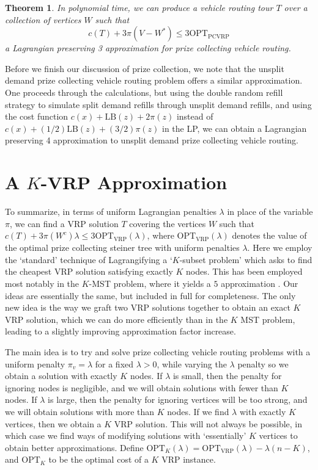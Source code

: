 \documentclass{article}
\theoremstyle{plain}
\theoremstyle{plain}
\newtheorem{theorem}{Theorem}
\begin{document}
\begin{theorem}
    In polynomial time, we can produce a vehicle routing tour $T$ over a collection of vertices $W$ such that
    \[ c(T) + 3\pi(V - W^*) \leq 3 \text{OPT}_{\text{PCVRP}} \]
    a Lagrangian preserving 3 approximation for prize collecting vehicle routing.
\end{theorem}

Before we finish our discussion of prize collection, we note that the unsplit demand prize collecting vehicle routing problem offers a similar approximation. One proceeds through the calculations, but using the double random refill strategy to simulate split demand refills through unsplit demand refills, and using the cost function $c(x) + \text{LB}(z) + 2 \pi(z)$ instead of $c(x) + (1/2) \text{LB}(z) + (3/2) \pi(z)$ in the LP, we can obtain a Lagrangian preserving 4 approximation to unsplit demand prize collecting vehicle routing.


\section{A $K$-VRP Approximation}

To summarize, in terms of uniform Lagrangian penalties $\lambda$ in place of the variable $\pi$, we can find a VRP solution $T$ covering the vertices $W$ such that $c(T) + 3 \pi(W^c) \lambda \leq 3 \text{OPT}_{\text{VRP}}(\lambda)$, where $\text{OPT}_{\text{VRP}}(\lambda)$ denotes the value of the optimal prize collecting steiner tree with uniform penalties $\lambda$. Here we employ the `standard' technique of Lagrangifying a `$K$-subset problem' which asks to find the cheapest VRP solution satisfying exactly $K$ nodes. This has been employed most notably in the $K$-MST problem, where it yields a $5$ approximation \cite{MSTLPApprox}. Our ideas are essentially the same, but included in full for completeness. The only new idea is the way we graft two VRP solutions together to obtain an exact $K$ VRP solution, which we can do more efficiently than in the $K$ MST problem, leading to a slightly improving approximation factor increase.

The main idea is to try and solve prize collecting vehicle routing problems with a uniform penalty $\pi_v = \lambda$ for a fixed $\lambda > 0$, while varying the $\lambda$ penalty so we obtain a solution with exactly $K$ nodes. If $\lambda$ is small, then the penalty for ignoring nodes is negligible, and we will obtain solutions with fewer than $K$ nodes. If $\lambda$ is large, then the penalty for ignoring vertices will be too strong, and we will obtain solutions with more than $K$ nodes. If we find $\lambda$ with exactly $K$ vertices, then we obtain a $K$ VRP solution. This will not always be possible, in which case we find ways of modifying solutions with `essentially' $K$ vertices to obtain better approximations. Define $\text{OPT}_K(\lambda) = \text{OPT}_{\text{VRP}}(\lambda) - \lambda (n - K)$, and $\text{OPT}_K$ to be the optimal cost of a $K$ VRP instance.
\end{document}
